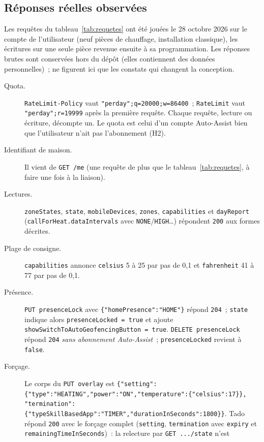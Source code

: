 \subsection{Réponses réelles observées}
\label{sec:observations}

Les requêtes du tableau~\ref{tab:requetes} ont été jouées le 28 octobre 2026 sur le compte de
l'utilisateur (neuf pièces de chauffage, installation classique), les écritures sur une seule pièce
revenue ensuite à sa programmation. Les réponses brutes sont conservées hors du dépôt (elles
contiennent des données personnelles)~; ne figurent ici que les constats qui changent la conception.

\begin{description}
  \item[Quota.] \texttt{RateLimit-Policy} vaut \texttt{"perday";q=20000;w=86400}~; \texttt{RateLimit}
    vaut \texttt{"perday";r=19999} après la première requête. Chaque requête, lecture ou écriture,
    décompte un. Le quota est celui d'un compte Auto-Assist bien que l'utilisateur n'ait pas
    l'abonnement (H2).
  \item[Identifiant de maison.] Il vient de \texttt{GET /me} (une requête de plus que le
    tableau~\ref{tab:requetes}, à faire une fois à la liaison).
  \item[Lectures.] \texttt{zoneStates}, \texttt{state}, \texttt{mobileDevices}, \texttt{zones},
    \texttt{capabilities} et
    \texttt{dayReport} (\texttt{callForHeat.dataIntervals} avec \texttt{NONE}/\texttt{HIGH}…)
    répondent \texttt{200} aux formes décrites.
  \item[Plage de consigne.] \texttt{capabilities} annonce \texttt{celsius} 5 à 25 par pas de 0,1 et
    \texttt{fahrenheit} 41 à 77 par pas de 0,1.
  \item[Présence.] \texttt{PUT presenceLock} avec \texttt{\{"homePresence":"HOME"\}} répond \texttt{204}~;
    \texttt{state} indique alors \texttt{presenceLocked = true} et ajoute
    \texttt{showSwitchToAutoGeofencingButton = true}. \texttt{DELETE presenceLock} répond \texttt{204}
    \emph{sans abonnement Auto-Assist}~; \texttt{presenceLocked} revient à \texttt{false}.
  \item[Forçage.] Le corps du \texttt{PUT overlay} est
    \texttt{\{"setting":\{"type":"HEATING","power":"ON","temperature":\{"celsius":17\}\},
    "termination":\{"typeSkillBasedApp":"TIMER","durationInSeconds":1800\}\}}. Tado répond
    \texttt{200} avec le forçage complet (\texttt{setting}, \texttt{termination} avec
    \texttt{expiry} et \texttt{remainingTimeInSeconds})~: la relecture par \texttt{GET .../state} n'est

\end{description}
